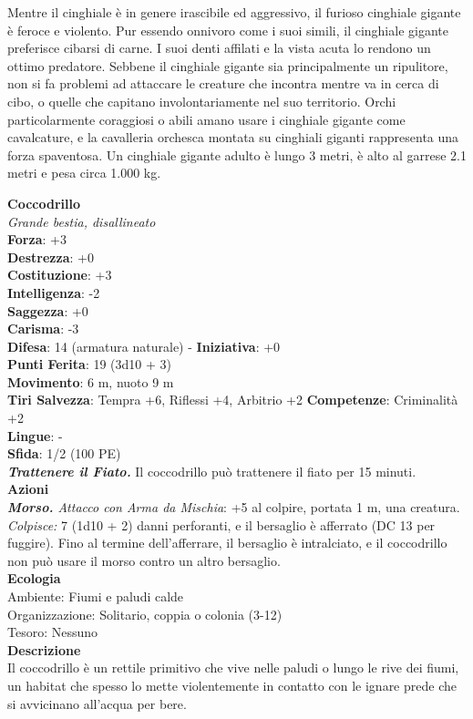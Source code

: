 \begin{multicols}{2}
Mentre il cinghiale è in genere irascibile ed aggressivo, il furioso cinghiale gigante è feroce e violento. Pur essendo onnivoro come i suoi simili, il cinghiale gigante preferisce cibarsi di carne. I suoi denti affilati e la vista acuta lo rendono un ottimo predatore. Sebbene il cinghiale gigante sia principalmente un ripulitore, non si fa problemi ad attaccare le creature che incontra mentre va in cerca di cibo, o quelle che capitano involontariamente nel suo territorio. Orchi particolarmente coraggiosi o abili amano usare i cinghiale gigante come cavalcature, e la cavalleria orchesca montata su cinghiali giganti rappresenta una forza spaventosa. Un cinghiale gigante adulto è lungo 3 metri, è alto al garrese 2.1 metri e pesa circa 1.000 kg.


\medskip\textbf{Coccodrillo}\\
\emph{Grande bestia, disallineato}\\
\textbf{Forza}: +3\\
\textbf{Destrezza}: +0\\
\textbf{Costituzione}: +3\\
\textbf{Intelligenza}: -2\\
\textbf{Saggezza}: +0\\
\textbf{Carisma}: -3\\
\textbf{Difesa}: 14 (armatura naturale) - \textbf{Iniziativa}: +0\\
\textbf{Punti Ferita}: 19 (3d10 + 3)\\
\textbf{Movimento}: 6 m, nuoto 9 m\\
\textbf{Tiri Salvezza}: Tempra +6, Riflessi +4, Arbitrio +2 
\textbf{Competenze}: Criminalità +2\\
\textbf{Lingue}: -\\
\textbf{Sfida}: 1/2 (100 PE)\smallskip\\
\emph{\textbf{Trattenere il Fiato.}} Il coccodrillo può trattenere il fiato per 15 minuti.\\
\smallskip\textbf{Azioni}\\
\emph{\textbf{Morso.} Attacco con Arma da Mischia}: +5 al colpire, portata 1 m, una creatura.\\
\emph{Colpisce:} 7 (1d10 + 2) danni perforanti, e il bersaglio è afferrato (DC  13 per fuggire). Fino al termine dell'afferrare, il bersaglio è intralciato, e il coccodrillo non può usare il morso contro un altro bersaglio.\\
\textbf{Ecologia}\\
Ambiente: Fiumi e paludi calde\\
Organizzazione: Solitario, coppia o colonia (3-12)\\
Tesoro: Nessuno\\
\textbf{Descrizione}\\
Il coccodrillo è un rettile primitivo che vive nelle paludi o lungo le rive dei fiumi, un habitat che spesso lo mette violentemente in contatto con le ignare prede che si avvicinano all'acqua per bere.\\


\end{multicols}
